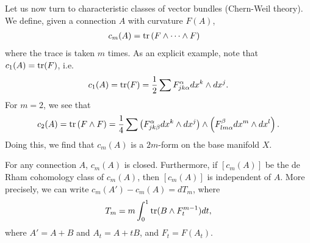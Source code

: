 \documentclass{../mathnotes}
\begin{document}
Let us now turn to characteristic classes of vector bundles (Chern-Weil theory). We define, given a connection $A$ with curvature $F(A)$,
\begin{align*}
    c_m(A)&=\operatorname{tr}\left( F\wedge\cdots \wedge F \right)
\end{align*}
where the trace is taken $m$ times. As an explicit example, note that $c_1(A)=\operatorname{tr}(F)$, i.e.
\[c_1(A)=\operatorname{tr}(F)=\frac{1}{2}\sum F_{jk\alpha}^\alpha dx^k\wedge dx^j.\]
For $m=2$, we see that
\begin{align*}
    c_2(A)=\operatorname{tr}\left( F\wedge F \right)=\frac{1}{4}\sum\left( F_{jk\beta}^\alpha dx^k\wedge dx^j \right)\wedge \left( F_{lm\alpha}^\beta dx^m\wedge dx^l \right).
\end{align*}
Doing this, we find that $c_m(A)$ is a $2m$-form on the base manifold $X$.
\begin{thm}
    For any connection $A$, $c_m(A)$ is closed. Furthermore, if $[c_m(A)]$ be the de Rham cohomology class of $c_m(A)$,
    then $[c_m(A)]$ is independent of $A$. More precisely, we can write $c_m(A')-c_m(A)=dT_m$, where
    \[T_m=m\int^1_0\operatorname{tr}(B\wedge F_t^{m-1}) dt,\]
    where $A'=A+B$ and $A_t=A+tB$, and $F_t=F(A_t)$.
\end{thm}
\end{document}
